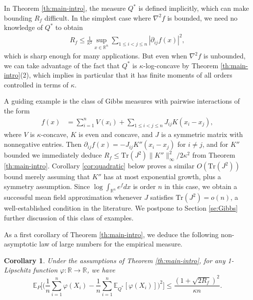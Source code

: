 \documentclass[11pt,reqno]{amsart}
\numberwithin{equation}{section}
\newtheorem{corollary}[theorem]{Corollary}
\theoremstyle{definition}
\def\E{{\mathbb E}}
\def\R{{\mathbb R}}
\def\tr{{\mathrm{Tr}}}
\begin{document}
In Theorem \ref{th:main-intro}, the measure $Q^*$ is defined implicitly, which can make bounding $R_f$ difficult. 
In the simplest case where $\nabla^2f$ is bounded, we need no knowledge of $Q^*$ to obtain
\begin{align*}
	R_f \le \frac{1}{\kappa^2}\sup_{x \in \R^n}\sum_{1 \le i < j \le n} |\partial_{ij}f(x)|^2,
\end{align*}
which is sharp enough for many applications.
But even when $\nabla^2f$ is unbounded, we can take advantage of the fact that $Q^*$ is $\kappa$-log-concave by Theorem \ref{th:main-intro}(2), which implies in particular that it has finite moments of all orders controlled in terms of $\kappa$.

	A guiding example is the class of Gibbs measures with pairwise interactions of the form
	\begin{align}
		f(x) &= \sum_{i=1}^n V(x_i) + \sum_{1 \le i < j \le n} J_{ij} K(x_i-x_j), \label{def:Gibbs-potential}
	\end{align}
	where $V$ is $\kappa$-concave, $K$ is even and concave, and $J$ is a symmetric matrix with nonnegative entries. Then $\partial_{ij}f(x)=-J_{ij}K''(x_i-x_j)$ for $i \neq j$, and for $K''$ bounded we immediately deduce $R_f \le \tr(J^2)\|K''\|_\infty^2/2\kappa^2$ from Theorem \ref{th:main-intro}.
	Corollary \ref{cor:quadratic} below proves a similar $O(\tr(J^2))$ bound merely assuming that $K''$ has at most exponential growth, plus a symmetry assumption.
	Since $\log\int_{\R^n} e^f dx$ is order $n$ in this case, we obtain a successful mean field approximation whenever $J$ satisfies $\tr(J^2)=o(n)$, a well-established condition in the literature. We postpone to Section \ref{se:Gibbs} further discussion of this class of examples.



As a first corollary of Theorem \ref{th:main-intro}, we deduce the following non-asymptotic law of large numbers for the empirical measure.

\begin{corollary} \label{co:linearstat-concentration}
	Under the assumptions of Theorem \ref{th:main-intro}, for any 1-Lipschitz function $\varphi : \R \to \R$, we have
	\begin{equation}
		\E_P\bigg[ \bigg(\frac{1}{n}\sum_{i=1}^n\varphi(X_i) - \frac{1}{n}\sum_{i=1}^n\E_{Q^*}[\varphi(X_i)]\bigg)^2\bigg]  \le \frac{(1 +  \sqrt{2R_f})^2}{\kappa n} . \label{ineq:weakLLN}
	\end{equation}
\end{corollary}
\end{document}
